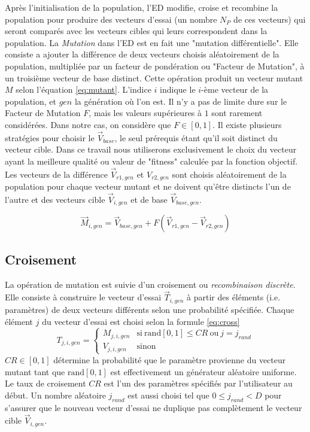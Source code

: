Après l'initialisation de la population, l'ED modifie, croise et recombine la population pour produire des vecteurs d'essai (un nombre $N_P$ de ces vecteurs) qui seront comparés avec les vecteurs cibles qui leurs correspondent dans la population. La \textit{Mutation} dans l'ED est en fait une "mutation différentielle". Elle consiste a ajouter la différence de deux vecteurs choisis aléatoirement de la population, multipliée par un facteur de pondération ou "Facteur de Mutation", à un troisième vecteur de base distinct. Cette opération produit un vecteur mutant $M$ selon l'équation \ref{eq:mutant}. L'indice $i$ indique le $i$-ème vecteur de la population, et $gen$ la génération où l'on est. 
Il n'y a pas de limite dure sur le Facteur de Mutation $F$, mais les valeurs supérieures à $1$ sont rarement considérées. Dans notre cas, on considère que $F \in [0, 1]$. Il existe plusieurs stratégies pour choisir le $\vec{V}_{base}$, le seul prérequis étant qu'il soit distinct du vecteur cible. Dans ce travail nous utiliserons exclusivement le choix du vecteur ayant la meilleure qualité ou valeur de "fitness" calculée par la fonction objectif. Les vecteurs de la différence $\vec{V}_{r1,gen}$ et $V_{r2,gen}$ sont choisis aléatoirement de la population pour chaque vecteur mutant et ne doivent qu'être distincts l'un de l'autre et des vecteurs cible $\vec{V}_{i, gen}$ et de base $\vec{V}_{base, gen}$.

\begin{equation}
  \label{eq:mutant}
  \vec{M}_{i,gen} = \vec{V}_{base,gen} + F (\vec{V}_{r1,gen} - \vec{V}_{r2,gen})  
\end{equation}

\subsection{Croisement}
La opération de mutation est suivie d'un croisement ou \textit{recombinaison discrète}. Elle consiste à construire le vecteur d'essai $\vec{T}_{i,gen}$ à partir des éléments (i.e. paramètres) de deux vecteurs différents selon une probabilité spécifiée. Chaque élément $j$ du vecteur d'essai est choisi selon la formule \ref{eq:cross}
\begin{equation}
  \label{eq:cross}
  T_{j,i,gen} =
  \begin{cases}
    M_{j,i,gen} & \text{si}\ \text{rand}[0, 1] \leq CR\ \text{ou}\ j = j_{rand}\\
    V_{j,i,gen} & \text{sinon}
  \end{cases}
\end{equation}
$CR \in [0,1]$ détermine la probabilité que le paramètre provienne du vecteur mutant tant que $\text{rand}[0, 1]$ est effectivement un générateur aléatoire uniforme. Le taux de croisement $CR$ est l'un des paramètres spécifiés par l'utilisateur au début. Un nombre aléatoire $j_{rand}$ est aussi choisi tel que $0 \leq j_{rand} < D$ pour s'assurer que le nouveau vecteur d'essai ne duplique pas complètement le vecteur cible $\vec{V}_{i,gen}$.

